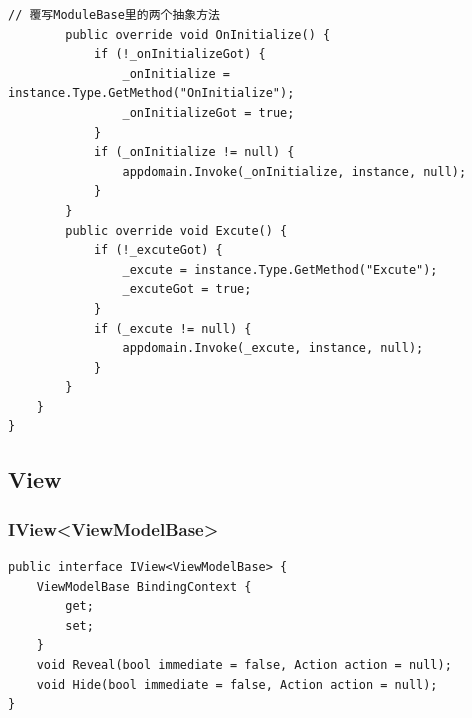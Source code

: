 \documentclass[9pt, b5paper]{article}
\begin{document}
\begin{verbatim}
// 覆写ModuleBase里的两个抽象方法
        public override void OnInitialize() {
            if (!_onInitializeGot) {
                _onInitialize = instance.Type.GetMethod("OnInitialize");
                _onInitializeGot = true;
            }
            if (_onInitialize != null) {
                appdomain.Invoke(_onInitialize, instance, null);
            }
        }
        public override void Excute() {
            if (!_excuteGot) {
                _excute = instance.Type.GetMethod("Excute");
                _excuteGot = true;
            }
            if (_excute != null) {
                appdomain.Invoke(_excute, instance, null);
            }
        }
    }
}
\end{verbatim}
\subsection{View}
\label{sec-6-4}
\subsubsection{IView<ViewModelBase>}
\label{sec-6-4-1}
\begin{verbatim}
public interface IView<ViewModelBase> {
    ViewModelBase BindingContext {
        get;
        set;
    }
    void Reveal(bool immediate = false, Action action = null);
    void Hide(bool immediate = false, Action action = null);
}
\end{verbatim}
\end{document}
